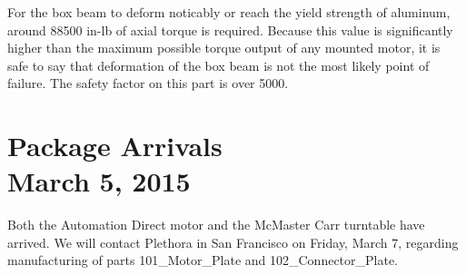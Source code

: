 \documentclass[11pt]{article}
\begin{document}
For the box beam to deform noticably or reach the yield strength of aluminum, around 88500 in-lb of axial torque is required. Because this value is significantly higher than the maximum possible torque output of any mounted motor, it is safe to say that deformation of the box beam is not the most likely point of failure. The safety factor on this part is over 5000.

\section{Package Arrivals \\ March 5, 2015}
Both the Automation Direct motor and the McMaster Carr turntable have arrived. We will contact Plethora in San Francisco on Friday, March 7, regarding manufacturing of parts 101\_Motor\_Plate and 102\_Connector\_Plate.
\end{document}
